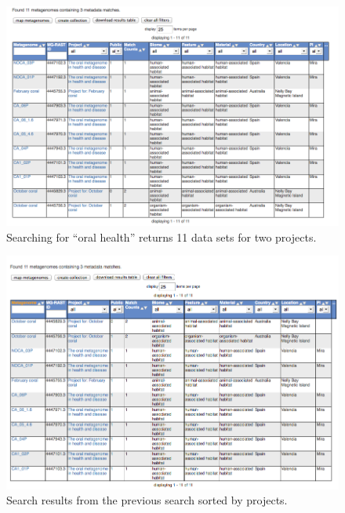 \documentclass[12pt,fullpage]{report}
\begin{document}
\begin{figure}
\begin{center}
\includegraphics[width=6in]{Images/search-page-unsorted-results.png}
\end{center}
\caption{Searching for ``oral health'' returns 11 data sets for two projects. }
\label{fig:search-page-unsorted-results}
\end{figure}

\begin{figure}
\begin{center}
\includegraphics[width=6in]{Images/search-page-sorted-results.png}
\end{center}
\caption{Search results from the previous search sorted by projects.}
\label{fig:search-page-sorted-results}
\end{figure}
\end{document}

